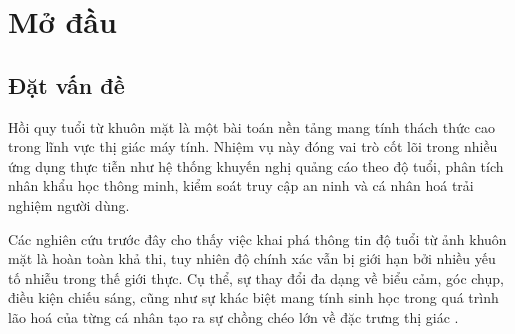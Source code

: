 

\chapter{Mở đầu}

\section{Đặt vấn đề}
Hồi quy tuổi từ khuôn mặt là một bài toán nền tảng mang tính thách thức cao trong lĩnh vực thị giác máy tính. Nhiệm vụ này đóng vai trò cốt lõi trong nhiều ứng dụng thực tiễn như hệ thống khuyến nghị quảng cáo theo độ tuổi, phân tích nhân khẩu học thông minh, kiểm soát truy cập an ninh và cá nhân hoá trải nghiệm người dùng. 

Các nghiên cứu trước đây cho thấy việc khai phá thông tin độ tuổi từ ảnh khuôn mặt là hoàn toàn khả thi, tuy nhiên độ chính xác vẫn bị giới hạn bởi nhiều yếu tố nhiễu trong thế giới thực. Cụ thể, sự thay đổi đa dạng về biểu cảm, góc chụp, điều kiện chiếu sáng, cũng như sự khác biệt mang tính sinh học trong quá trình lão hoá của từng cá nhân tạo ra sự chồng chéo lớn về đặc trưng thị giác \cite{Rothe2015DEX,Zhang2017AgeProgression}.

